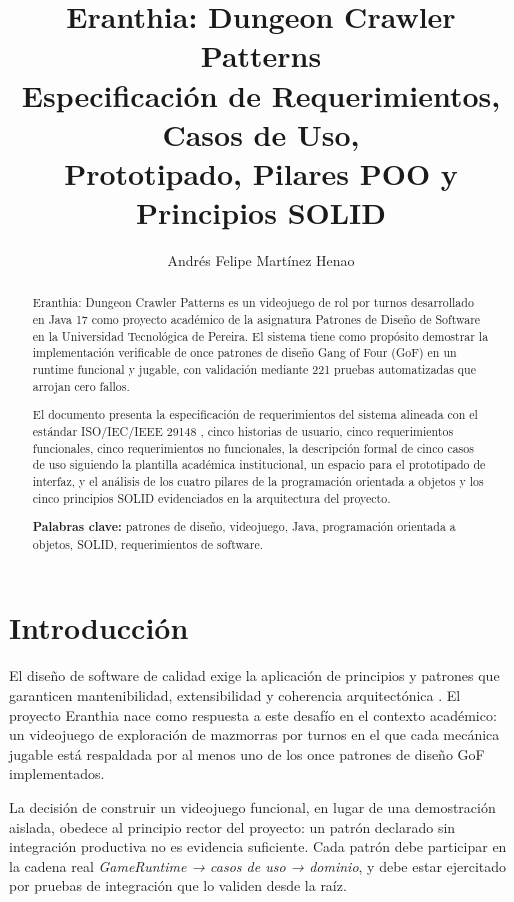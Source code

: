 \documentclass[stu,12pt,floatsintext]{apa7}
\title{Eranthia: Dungeon Crawler Patterns\\
Especificación de Requerimientos, Casos de Uso,\\
Prototipado, Pilares POO y Principios SOLID}
\author{Andrés Felipe Martínez Henao}
\affiliation{%
Universidad Tecnológica de Pereira\\
Facultad de Ingenierías\\
Tecnología en Desarrollo de Software
}
\begin{document}
\maketitle


\begin{abstract}
Eranthia: Dungeon Crawler Patterns es un videojuego de rol por turnos desarrollado en Java 17 como proyecto académico de la asignatura Patrones de Diseño de Software en la Universidad Tecnológica de Pereira. El sistema tiene como propósito demostrar la implementación verificable de once patrones de diseño Gang of Four (GoF) en un runtime funcional y jugable, con validación mediante 221 pruebas automatizadas que arrojan cero fallos.

El documento presenta la especificación de requerimientos del sistema alineada con el estándar ISO/IEC/IEEE 29148 \cite{iso29148}, cinco historias de usuario, cinco requerimientos funcionales, cinco requerimientos no funcionales, la descripción formal de cinco casos de uso siguiendo la plantilla académica institucional, un espacio para el prototipado de interfaz, y el análisis de los cuatro pilares de la programación orientada a objetos y los cinco principios SOLID evidenciados en la arquitectura del proyecto.

\textbf{Palabras clave:} patrones de diseño, videojuego, Java, programación orientada a objetos, SOLID, requerimientos de software.
\end{abstract}

\newpage


\section{Introducción}

El diseño de software de calidad exige la aplicación de principios y patrones que garanticen mantenibilidad, extensibilidad y coherencia arquitectónica \cite{gamma1994,martin2003}. El proyecto Eranthia nace como respuesta a este desafío en el contexto académico: un videojuego de exploración de mazmorras por turnos en el que cada mecánica jugable está respaldada por al menos uno de los once patrones de diseño GoF implementados.

La decisión de construir un videojuego funcional, en lugar de una demostración aislada, obedece al principio rector del proyecto: un patrón declarado sin integración productiva no es evidencia suficiente. Cada patrón debe participar en la cadena real \textit{GameRuntime → casos de uso → dominio}, y debe estar ejercitado por pruebas de integración que lo validen desde la raíz.
\end{document}
